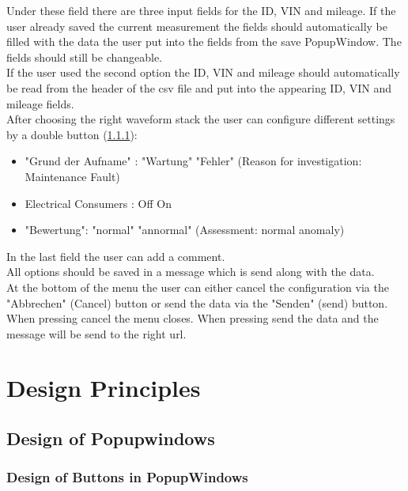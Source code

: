 \documentclass{scrreprt}
\begin{document}
Under these field there are three input fields for the ID, VIN and mileage. If the user already saved the current measurement the fields should automatically be filled with the data the user put into the fields from the save PopupWindow. The fields should still be changeable.\\
If the user used the second option the ID, VIN and mileage should automatically be read from the header of the csv file and put into the appearing ID, VIN and mileage fields. \\

After choosing the right waveform stack the user can configure different settings by a double button (\ref{cap:Designprinciples_PopupWindowButtons}): 
\begin{itemize}
    \item "Grund der Aufname" : "Wartung" "Fehler" (Reason for investigation: Maintenance Fault)
    \item Electrical Consumers : Off On 
    \item "Bewertung": "normal" "annormal" (Assessment: normal anomaly)
\end{itemize}

In the last field the user can add a comment. \\ 

All options should be saved in a message which is send along with the data. \\

At the bottom of the menu the user can either cancel the configuration via the "Abbrechen" (Cancel) button or send the data via the "Senden" (send) button. \\
When pressing cancel the menu closes. When pressing send the data and the message will be send to the right url. 


\section{Design Principles}\label{cap:Designprinciples}

\subsection{Design of Popupwindows}\label{cap:Designprinciples_Popupwindows}

\subsubsection{Design of Buttons in PopupWindows}\label{cap:Designprinciples_PopupWindowButtons}
\end{document}
